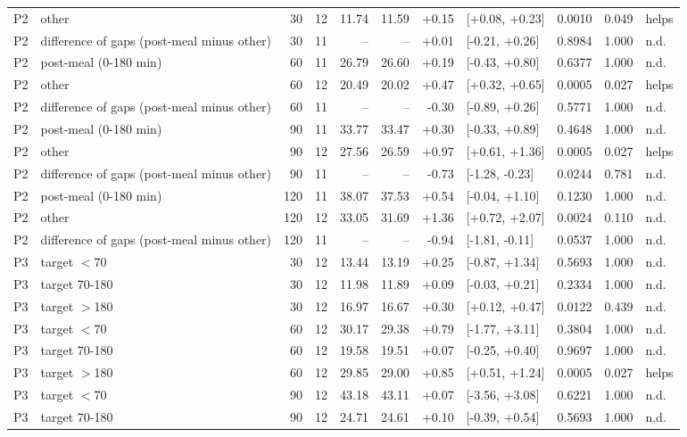 \documentclass[10pt]{article}
\begin{document}
{\begin{longtable}{l>{\raggedright\arraybackslash}p{3.6cm}rrrrrlrrl}
P2 & other & 30 & 12 & 11.74 & 11.59 & +0.15 & [+0.08, +0.23] & 0.0010 & 0.049 & helps \\
P2 & difference of gaps (post-meal minus other) & 30 & 11 & -- & -- & +0.01 & [-0.21, +0.26] & 0.8984 & 1.000 & n.d. \\
P2 & post-meal (0-180 min) & 60 & 11 & 26.79 & 26.60 & +0.19 & [-0.43, +0.80] & 0.6377 & 1.000 & n.d. \\
P2 & other & 60 & 12 & 20.49 & 20.02 & +0.47 & [+0.32, +0.65] & 0.0005 & 0.027 & helps \\
P2 & difference of gaps (post-meal minus other) & 60 & 11 & -- & -- & -0.30 & [-0.89, +0.26] & 0.5771 & 1.000 & n.d. \\
P2 & post-meal (0-180 min) & 90 & 11 & 33.77 & 33.47 & +0.30 & [-0.33, +0.89] & 0.4648 & 1.000 & n.d. \\
P2 & other & 90 & 12 & 27.56 & 26.59 & +0.97 & [+0.61, +1.36] & 0.0005 & 0.027 & helps \\
P2 & difference of gaps (post-meal minus other) & 90 & 11 & -- & -- & -0.73 & [-1.28, -0.23] & 0.0244 & 0.781 & n.d. \\
P2 & post-meal (0-180 min) & 120 & 11 & 38.07 & 37.53 & +0.54 & [-0.04, +1.10] & 0.1230 & 1.000 & n.d. \\
P2 & other & 120 & 12 & 33.05 & 31.69 & +1.36 & [+0.72, +2.07] & 0.0024 & 0.110 & n.d. \\
P2 & difference of gaps (post-meal minus other) & 120 & 11 & -- & -- & -0.94 & [-1.81, -0.11] & 0.0537 & 1.000 & n.d. \\
P3 & target $<$70 & 30 & 12 & 13.44 & 13.19 & +0.25 & [-0.87, +1.34] & 0.5693 & 1.000 & n.d. \\
P3 & target 70-180 & 30 & 12 & 11.98 & 11.89 & +0.09 & [-0.03, +0.21] & 0.2334 & 1.000 & n.d. \\
P3 & target $>$180 & 30 & 12 & 16.97 & 16.67 & +0.30 & [+0.12, +0.47] & 0.0122 & 0.439 & n.d. \\
P3 & target $<$70 & 60 & 12 & 30.17 & 29.38 & +0.79 & [-1.77, +3.11] & 0.3804 & 1.000 & n.d. \\
P3 & target 70-180 & 60 & 12 & 19.58 & 19.51 & +0.07 & [-0.25, +0.40] & 0.9697 & 1.000 & n.d. \\
P3 & target $>$180 & 60 & 12 & 29.85 & 29.00 & +0.85 & [+0.51, +1.24] & 0.0005 & 0.027 & helps \\
P3 & target $<$70 & 90 & 12 & 43.18 & 43.11 & +0.07 & [-3.56, +3.08] & 0.6221 & 1.000 & n.d. \\
P3 & target 70-180 & 90 & 12 & 24.71 & 24.61 & +0.10 & [-0.39, +0.54] & 0.5693 & 1.000 & n.d. \\

\end{longtable}}
\end{document}
